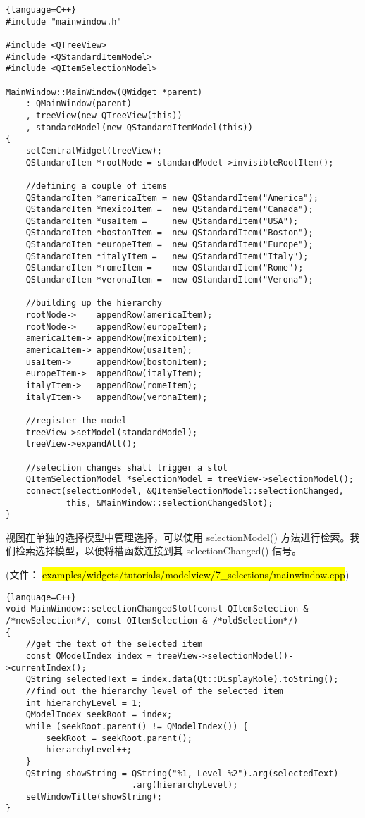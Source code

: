 \begin{lstlisting}{language=C++}
#include "mainwindow.h"

#include <QTreeView>
#include <QStandardItemModel>
#include <QItemSelectionModel>

MainWindow::MainWindow(QWidget *parent)
    : QMainWindow(parent)
    , treeView(new QTreeView(this))
    , standardModel(new QStandardItemModel(this))
{
    setCentralWidget(treeView);
    QStandardItem *rootNode = standardModel->invisibleRootItem();

    //defining a couple of items
    QStandardItem *americaItem = new QStandardItem("America");
    QStandardItem *mexicoItem =  new QStandardItem("Canada");
    QStandardItem *usaItem =     new QStandardItem("USA");
    QStandardItem *bostonItem =  new QStandardItem("Boston");
    QStandardItem *europeItem =  new QStandardItem("Europe");
    QStandardItem *italyItem =   new QStandardItem("Italy");
    QStandardItem *romeItem =    new QStandardItem("Rome");
    QStandardItem *veronaItem =  new QStandardItem("Verona");

    //building up the hierarchy
    rootNode->    appendRow(americaItem);
    rootNode->    appendRow(europeItem);
    americaItem-> appendRow(mexicoItem);
    americaItem-> appendRow(usaItem);
    usaItem->     appendRow(bostonItem);
    europeItem->  appendRow(italyItem);
    italyItem->   appendRow(romeItem);
    italyItem->   appendRow(veronaItem);

    //register the model
    treeView->setModel(standardModel);
    treeView->expandAll();

    //selection changes shall trigger a slot
    QItemSelectionModel *selectionModel = treeView->selectionModel();
    connect(selectionModel, &QItemSelectionModel::selectionChanged,
            this, &MainWindow::selectionChangedSlot);
}
\end{lstlisting}

视图在单独的选择模型中管理选择，可以使用 selectionModel() 方法进行检索。我们检索选择模型，以便将槽函数连接到其 selectionChanged() 信号。

(文件： \hl{examples/widgets/tutorials/modelview/7\_selections/mainwindow.cpp})

\begin{lstlisting}{language=C++}
void MainWindow::selectionChangedSlot(const QItemSelection & /*newSelection*/, const QItemSelection & /*oldSelection*/)
{
    //get the text of the selected item
    const QModelIndex index = treeView->selectionModel()->currentIndex();
    QString selectedText = index.data(Qt::DisplayRole).toString();
    //find out the hierarchy level of the selected item
    int hierarchyLevel = 1;
    QModelIndex seekRoot = index;
    while (seekRoot.parent() != QModelIndex()) {
        seekRoot = seekRoot.parent();
        hierarchyLevel++;
    }
    QString showString = QString("%1, Level %2").arg(selectedText)
                         .arg(hierarchyLevel);
    setWindowTitle(showString);
}
\end{lstlisting}

